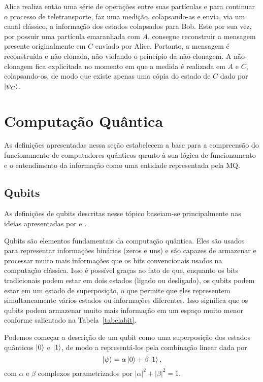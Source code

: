 Alice realiza então uma série de operações entre suas partículas e para continuar o processo de teletransporte, faz uma medição, colapsando-as e envia, via um canal clássico, a informação dos estados colapsados para Bob. Este por sua vez, por possuir uma partícula emaranhada com $A$, consegue reconstruir a mensagem presente originalmente em $C$ enviado por Alice. Portanto, a mensagem é reconstruída e não clonada, não violando o princípio da não-clonagem. A não-clonagem fica explicitada no momento em que a medida é realizada em $A$ e $C$, colapsando-os, de modo que existe apenas uma cópia do estado de $C$ dado por $\ket{\psi_{C}}$.


\section{Computação Quântica}\label{sec:compquant}

As definições apresentadas nessa seção estabelecem a base para a compreensão do funcionamento de computadores quânticos quanto à sua lógica de funcionamento e o entendimento da informação como uma entidade representada pela MQ.

\subsection{Qubits}\label{sec:qubits}

As definições de qubits descritas nesse tópico baseiam-se principalmente nas ideias apresentadas por \textcite{chuang} e \textcite{CompInfoQuantica}.

Qubits são elementos fundamentais da computação quântica. Eles são usados para representar informações binárias (zeros e uns) e são capazes de armazenar e processar muito mais informações que os bits convencionais usados na computação clássica. Isso é possível graças ao fato de que, enquanto os bits tradicionais podem estar em dois estados (ligado ou desligado), os qubits podem estar em um estado de superposição, o que permite que eles representem simultaneamente vários estados ou informações diferentes. Isso significa que os qubits podem armazenar muito mais informação em um espaço muito menor conforme salientado na Tabela~\ref{tabelabit}.

Podemos começar a descrição de um qubit como uma superposição dos estados quânticos $\ket{0}$ e $\ket{1}$, de modo a representá-los pela combinação linear dada por
\begin{equation}\label{eq:psi}
\ket{\psi} = \alpha \ket{0} + \beta \ket{1},
\end{equation}
com $\alpha$ e $\beta$ complexos parametrizados por \(|\alpha|^{2} + |\beta|^{2} = 1\).


